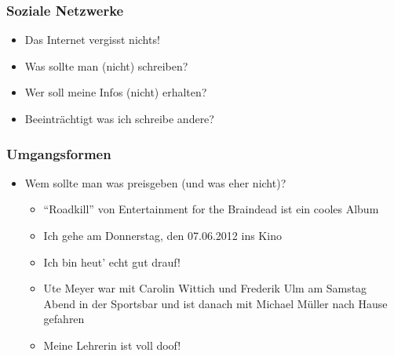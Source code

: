 \begin{frame}
    \frametitle{Soziale Netzwerke}
    \begin{itemize}
        \item<2-> Das Internet vergisst nichts!
        \item<3-> Was sollte man (nicht) schreiben?
        \item<5-> Wer soll meine Infos (nicht) erhalten?
        \item<6-> Beeinträchtigt was ich schreibe andere?
    \end{itemize}
\end{frame}

\begin{frame}
  \frametitle{Umgangsformen}
  \begin{itemize}
    \item Wem sollte man was preisgeben (und was eher nicht)?
      \begin{itemize}
        \item<2-> "`Roadkill"' von Entertainment for the Braindead ist ein cooles Album
        \item<3-> Ich gehe am Donnerstag, den 07.06.2012 ins Kino
        \item<4-> Ich bin heut' echt gut drauf!
        \item<5-> Ute Meyer war mit Carolin Wittich und Frederik Ulm am Samstag Abend in der Sportsbar und ist danach mit Michael Müller nach Hause gefahren
        \item<6-> Meine Lehrerin ist voll doof!
      \end{itemize}
  \end{itemize}
\end{frame}
